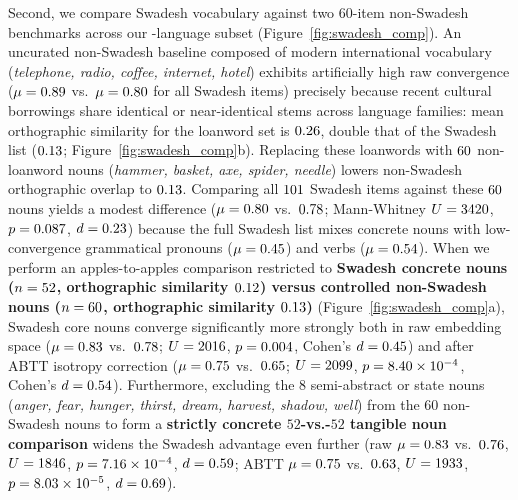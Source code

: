 Second, we compare Swadesh vocabulary against two 60-item non-Swadesh benchmarks across our \LayerwiseNumLangs{}-language subset (Figure~\ref{fig:swadesh_comp}).
An uncurated non-Swadesh baseline composed of modern international vocabulary (\emph{telephone, radio, coffee, internet, hotel}) exhibits artificially high raw convergence ($\mu = 0.89{}$ vs.\ $\mu = 0.80{}$ for all \NumConcepts{} Swadesh items) precisely because recent cultural borrowings share identical or near-identical stems across language families: mean orthographic similarity for the loanword set is $0.26{}$, double that of the Swadesh list ($0.13{}$; Figure~\ref{fig:swadesh_comp}b).
Replacing these loanwords with $60{}$ non-loanword nouns (\emph{hammer, basket, axe, spider, needle}) lowers non-Swadesh orthographic overlap to $0.13{}$.
Comparing all $101{}$ Swadesh items against these $60{}$ nouns yields a modest difference ($\mu = 0.80{}$ vs.\ $0.78{}$; Mann-Whitney $U = 3420{}$, $p = 0.087{}$, $d = 0.23{}$) because the full Swadesh list mixes concrete nouns with low-convergence grammatical pronouns ($\mu = 0.45{}$) and verbs ($\mu = 0.54{}$).
When we perform an apples-to-apples comparison restricted to \textbf{Swadesh concrete nouns ($n = 52{}$, orthographic similarity $0.12{}$) versus controlled non-Swadesh nouns ($n = 60{}$, orthographic similarity $0.13{}$)} (Figure~\ref{fig:swadesh_comp}a), Swadesh core nouns converge significantly more strongly both in raw embedding space ($\mu = 0.83{}$ vs.\ $0.78{}$; $U = 2016{}$, $p = 0.004{}$, Cohen's $d = 0.45{}$) and after ABTT isotropy correction ($\mu = 0.75{}$ vs.\ $0.65{}$; $U = 2099{}$, $p = 8.40 \times 10^{-4}{}$, Cohen's $d = 0.54{}$).
Furthermore, excluding the 8 semi-abstract or state nouns (\emph{anger, fear, hunger, thirst, dream, harvest, shadow, well}) from the 60 non-Swadesh nouns to form a \textbf{strictly concrete $52$-vs.-$52$ tangible noun comparison} widens the Swadesh advantage even further (raw $\mu = 0.83{}$ vs.\ $0.76{}$, $U = 1846{}$, $p = 7.16 \times 10^{-4}{}$, $d = 0.59{}$; ABTT $\mu = 0.75{}$ vs.\ $0.63{}$, $U = 1933{}$, $p = 8.03 \times 10^{-5}{}$, $d = 0.69{}$).

